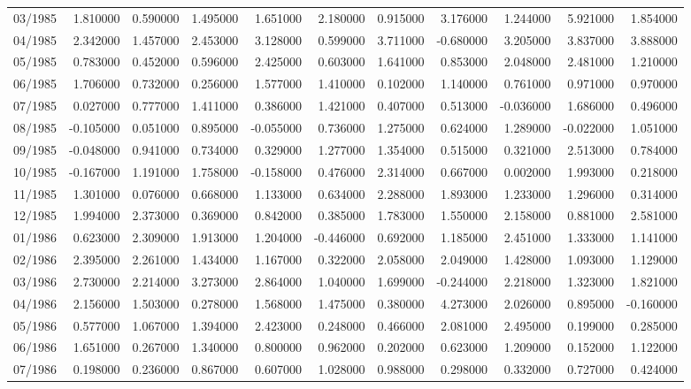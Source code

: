 \begin{tabular}{lrrrrrrrrrr}
03/1985 & 1.810000 & 0.590000 & 1.495000 & 1.651000 & 2.180000 & 0.915000 & 3.176000 & 1.244000 & 5.921000 & 1.854000 \\
04/1985 & 2.342000 & 1.457000 & 2.453000 & 3.128000 & 0.599000 & 3.711000 & -0.680000 & 3.205000 & 3.837000 & 3.888000 \\
05/1985 & 0.783000 & 0.452000 & 0.596000 & 2.425000 & 0.603000 & 1.641000 & 0.853000 & 2.048000 & 2.481000 & 1.210000 \\
06/1985 & 1.706000 & 0.732000 & 0.256000 & 1.577000 & 1.410000 & 0.102000 & 1.140000 & 0.761000 & 0.971000 & 0.970000 \\
07/1985 & 0.027000 & 0.777000 & 1.411000 & 0.386000 & 1.421000 & 0.407000 & 0.513000 & -0.036000 & 1.686000 & 0.496000 \\
08/1985 & -0.105000 & 0.051000 & 0.895000 & -0.055000 & 0.736000 & 1.275000 & 0.624000 & 1.289000 & -0.022000 & 1.051000 \\
09/1985 & -0.048000 & 0.941000 & 0.734000 & 0.329000 & 1.277000 & 1.354000 & 0.515000 & 0.321000 & 2.513000 & 0.784000 \\
10/1985 & -0.167000 & 1.191000 & 1.758000 & -0.158000 & 0.476000 & 2.314000 & 0.667000 & 0.002000 & 1.993000 & 0.218000 \\
11/1985 & 1.301000 & 0.076000 & 0.668000 & 1.133000 & 0.634000 & 2.288000 & 1.893000 & 1.233000 & 1.296000 & 0.314000 \\
12/1985 & 1.994000 & 2.373000 & 0.369000 & 0.842000 & 0.385000 & 1.783000 & 1.550000 & 2.158000 & 0.881000 & 2.581000 \\
01/1986 & 0.623000 & 2.309000 & 1.913000 & 1.204000 & -0.446000 & 0.692000 & 1.185000 & 2.451000 & 1.333000 & 1.141000 \\
02/1986 & 2.395000 & 2.261000 & 1.434000 & 1.167000 & 0.322000 & 2.058000 & 2.049000 & 1.428000 & 1.093000 & 1.129000 \\
03/1986 & 2.730000 & 2.214000 & 3.273000 & 2.864000 & 1.040000 & 1.699000 & -0.244000 & 2.218000 & 1.323000 & 1.821000 \\
04/1986 & 2.156000 & 1.503000 & 0.278000 & 1.568000 & 1.475000 & 0.380000 & 4.273000 & 2.026000 & 0.895000 & -0.160000 \\
05/1986 & 0.577000 & 1.067000 & 1.394000 & 2.423000 & 0.248000 & 0.466000 & 2.081000 & 2.495000 & 0.199000 & 0.285000 \\
06/1986 & 1.651000 & 0.267000 & 1.340000 & 0.800000 & 0.962000 & 0.202000 & 0.623000 & 1.209000 & 0.152000 & 1.122000 \\
07/1986 & 0.198000 & 0.236000 & 0.867000 & 0.607000 & 1.028000 & 0.988000 & 0.298000 & 0.332000 & 0.727000 & 0.424000 \\

\end{tabular}
